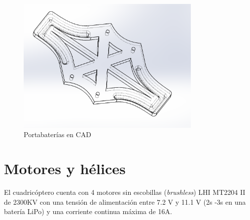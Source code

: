 \begin{itemize}
	\begin{figure}[htb!]
		\centering
		\includegraphics[width=0.8\textwidth]{hardware/lipo_support}
		\caption{Portabaterías en CAD}
		\label{portam}
	\end{figure}
	
	  
\end{itemize} 

\section{Motores y hélices}
El cuadricóptero cuenta con 4 motores sin escobillas (\textit{brushless}) LHI MT2204 II de 2300KV con una tensión de alimentación entre 7.2 V y 11.1 V (2s -3s en una batería LiPo) y una corriente continua máxima de 16A.

